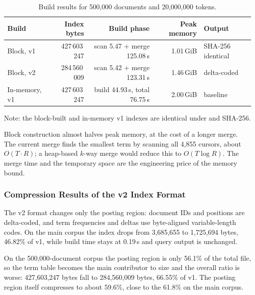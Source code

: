 \begin{table}[!htbp]
  \centering
  \caption{Build results for 500,000 documents and 20,000,000 tokens.}
  \label{tab:500k}
  \small
  \begin{tabularx}{\linewidth}{X r r r l}
    \toprule
    Build & Index bytes & Build phase & Peak memory & Output \\
    \midrule
    Block, v1 & 427\,603\,247 & scan 5.47 + merge 125.08\,s & 1.01\,GiB & SHA-256 identical \\
    Block, v2 & 284\,560\,009 & scan 5.42 + merge 123.31\,s & 1.46\,GiB & delta-coded \\
    In-memory, v1 & 427\,603\,247 & build 44.93\,s, total 76.75\,s & 2.00\,GiB & baseline \\
    \bottomrule
  \end{tabularx}
  \par\smallskip
  \footnotesize Note: the block-built and in-memory v1 indexes are identical
  under  and SHA-256.
\end{table}

Block construction almost halves peak memory, at the cost of a longer merge.
The current merge finds the smallest term by scanning all 4,855 cursors, about
$O(T\cdot R)$; a heap-based $k$-way merge would reduce this to
$O(T\log R)$. The merge time and the temporary space are the engineering price
of the memory bound.

\subsubsection{Compression Results of the v2 Index Format}
\label{sec:compression}

The v2 format changes only the posting region: document IDs and positions are
delta-coded, and term frequencies and deltas use byte-aligned variable-length
codes. On the main corpus the index drops from 3,685,655 to 1,725,694 bytes,
46.82\% of v1, while build time stays at 0.19\,s and query output is unchanged.

On the 500,000-document corpus the posting region is only 56.1\% of the total
file, so the term table becomes the main contributor to size and the overall
ratio is worse: 427,603,247 bytes fall to 284,560,009 bytes, 66.55\% of v1.
The posting region itself compresses to about 59.6\%, close to the 61.8\% on the
main corpus.

